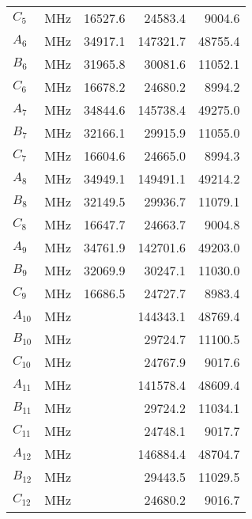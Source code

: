 \begin{table}
\begin{tabular}{lrrrr}
$C_{5    }$ &      MHz &         16527.6 &         24583.4 &          9004.6 \\
$A_{6    }$ &      MHz &         34917.1 &        147321.7 &         48755.4 \\
$B_{6    }$ &      MHz &         31965.8 &         30081.6 &         11052.1 \\
$C_{6    }$ &      MHz &         16678.2 &         24680.2 &          8994.2 \\
$A_{7    }$ &      MHz &         34844.6 &        145738.4 &         49275.0 \\
$B_{7    }$ &      MHz &         32166.1 &         29915.9 &         11055.0 \\
$C_{7    }$ &      MHz &         16604.6 &         24665.0 &          8994.3 \\
$A_{8    }$ &      MHz &         34949.1 &        149491.1 &         49214.2 \\
$B_{8    }$ &      MHz &         32149.5 &         29936.7 &         11079.1 \\
$C_{8    }$ &      MHz &         16647.7 &         24663.7 &          9004.8 \\
$A_{9    }$ &      MHz &         34761.9 &        142701.6 &         49203.0 \\
$B_{9    }$ &      MHz &         32069.9 &         30247.1 &         11030.0 \\
$C_{9    }$ &      MHz &         16686.5 &         24727.7 &          8983.4 \\
$A_{10   }$ &      MHz &                 &        144343.1 &         48769.4 \\
$B_{10   }$ &      MHz &                 &         29724.7 &         11100.5 \\
$C_{10   }$ &      MHz &                 &         24767.9 &          9017.6 \\
$A_{11   }$ &      MHz &                 &        141578.4 &         48609.4 \\
$B_{11   }$ &      MHz &                 &         29724.2 &         11034.1 \\
$C_{11   }$ &      MHz &                 &         24748.1 &          9017.7 \\
$A_{12   }$ &      MHz &                 &        146884.4 &         48704.7 \\
$B_{12   }$ &      MHz &                 &         29443.5 &         11029.5 \\
$C_{12   }$ &      MHz &                 &         24680.2 &          9016.7 \\

\end{tabular}
\end{table}
